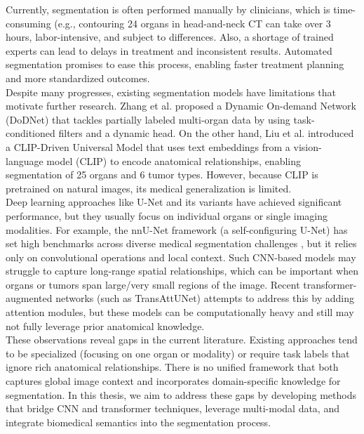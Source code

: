 \documentclass{cls/iutbscthesis}
\begin{document}
Currently, segmentation is often performed manually by clinicians, which is time-consuming (e.g., contouring 24 organs in head-and-neck CT can take over 3 hours, labor-intensive, and subject to differences. Also, a shortage of trained experts can lead to delays in treatment and inconsistent results.
Automated segmentation promises to ease this process, enabling faster treatment planning and more standardized outcomes.\\

Despite many progresses, existing segmentation models have limitations that motivate further research. Zhang et al. proposed a Dynamic On-demand Network (DoDNet) that tackles partially labeled multi-organ data by using task-conditioned filters and a dynamic head\cite{zhang2021dodnet}. On the other hand, Liu et al. introduced a CLIP-Driven Universal Model that uses text embeddings from a vision-language model (CLIP) to encode anatomical relationships, enabling segmentation of 25 organs and 6 tumor types\cite{liu2023clip}. However, because CLIP is pretrained on natural images, its medical generalization is limited.\\

Deep learning approaches like U-Net and its variants have achieved significant performance, but they usually focus on individual organs or single imaging modalities. For example, the nnU-Net framework (a self-configuring U-Net) has set high benchmarks across diverse medical segmentation challenges \cite{isensee2021nnunet}, but it relies only on convolutional operations and local context. Such CNN-based models may struggle to capture long-range spatial relationships, which can be important when organs or tumors span large/very small regions of the image. Recent transformer-augmented networks (such as TransAttUNet\cite{chen2024transattunet}) attempts to address this by adding attention modules, but these models can be computationally heavy and still may not fully leverage prior anatomical knowledge.\\

These observations reveal gaps in the current literature. Existing approaches tend to be specialized (focusing on one organ or modality) or require task labels that ignore rich anatomical relationships. There is no unified framework that both captures global image context and incorporates domain-specific knowledge for segmentation. In this thesis, we aim to address these gaps by developing methods that bridge CNN and transformer techniques, leverage multi-modal data, and integrate biomedical semantics into the segmentation process.
\end{document}
